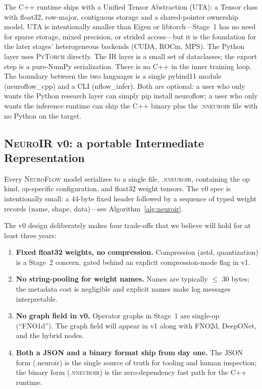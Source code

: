 \documentclass[10pt,twocolumn]{article}
\renewcommand{\texttt}[1]{{\normalfont\ttfamily #1}\normalfont\rmfamily}
\newcommand{\nf}{\textsc{NeuroFlow}}
\newcommand{\neuroir}{\textsc{NeuroIR}}
\newcommand{\nneuroir}{\textsc{.nneuroir}}
\newcommand{\py}{\textsc{PyTorch}}
\begin{document}
The C{++} runtime ships with a Unified Tensor Abstraction (UTA):
a \texttt{Tensor} class with float32, row-major, contiguous storage
and a shared-pointer ownership model.  UTA is intentionally smaller
than Eigen or \texttt{libtorch}---Stage~1 has no need for sparse
storage, mixed precision, or strided access---but it is the
foundation for the later stages' heterogeneous backends (CUDA,
ROCm, MPS).
%
The Python layer uses \py{} directly.  The IR layer is a small set
of dataclasses; the export step is a pure-NumPy serialization.
There is no C{++} in the inner training loop.
%
The boundary between the two languages is a single \texttt{pybind11}
module (\texttt{neuroflow\_cpp}) and a CLI
(\texttt{nflow\_infer}).  Both are optional: a user who only wants
the Python research layer can simply \texttt{pip install neuroflow};
a user who only wants the inference runtime can ship the C{++}
binary plus the \nneuroir{} file with no Python on the target.

\subsection{\neuroir{} v0: a portable Intermediate Representation}
\label{sec:neuroir}

Every \nf{} model serializes to a single file, \nneuroir{},
containing the op kind, op-specific configuration, and float32 weight
tensors.  The v0 spec is intentionally small: a 44-byte fixed
header followed by a sequence of typed weight records (name, shape,
data)---see Algorithm~\ref{alg:neuroir}.

The v0 design deliberately makes four trade-offs that we believe
will hold for at least three years:
\begin{enumerate}[leftmargin=*,itemsep=1pt,topsep=2pt]
  \item \textbf{Fixed float32 weights, no compression.}  Compression
  (zstd, quantization) is a Stage~2 concern, gated behind an
  explicit compression-mode flag in v1.
  \item \textbf{No string-pooling for weight names.}  Names are
  typically $\leq$ 30 bytes; the metadata cost is negligible and
  explicit names make log messages interpretable.
  \item \textbf{No graph field in v0.}  Operator graphs in Stage~1
  are single-op (``FNO1d'').  The graph field will appear in v1
  along with FNO2d, DeepONet, and the hybrid nodes.
  \item \textbf{Both a JSON and a binary format ship from day one.}
  The JSON form (\texttt{.neuroir}) is the single source of truth
  for tooling and human inspection; the binary form (\nneuroir{}) is
  the zero-dependency fast path for the C{++} runtime.
\end{enumerate}
\end{document}
